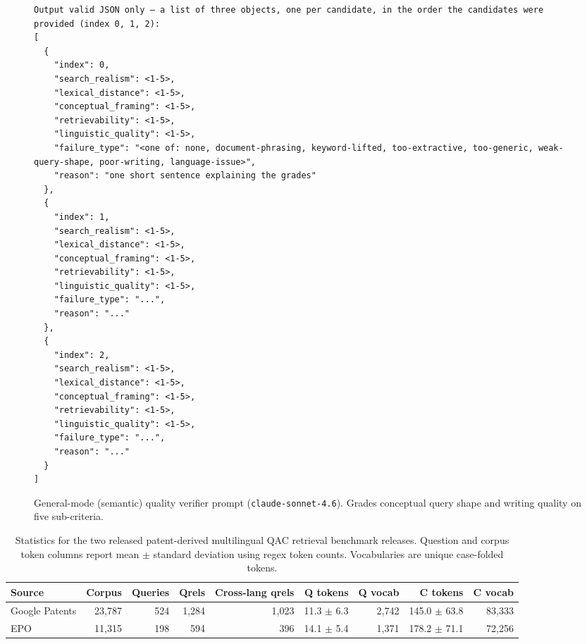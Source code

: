 \begin{figure}[h!]
\begin{minipage}{0.95\textwidth}
\begin{Verbatim}[breaklines=true, breakanywhere=true]
Output valid JSON only — a list of three objects, one per candidate, in the order the candidates were provided (index 0, 1, 2):
[
  {
    "index": 0,
    "search_realism": <1-5>,
    "lexical_distance": <1-5>,
    "conceptual_framing": <1-5>,
    "retrievability": <1-5>,
    "linguistic_quality": <1-5>,
    "failure_type": "<one of: none, document-phrasing, keyword-lifted, too-extractive, too-generic, weak-query-shape, poor-writing, language-issue>",
    "reason": "one short sentence explaining the grades"
  },
  {
    "index": 1,
    "search_realism": <1-5>,
    "lexical_distance": <1-5>,
    "conceptual_framing": <1-5>,
    "retrievability": <1-5>,
    "linguistic_quality": <1-5>,
    "failure_type": "...",
    "reason": "..."
  },
  {
    "index": 2,
    "search_realism": <1-5>,
    "lexical_distance": <1-5>,
    "conceptual_framing": <1-5>,
    "retrievability": <1-5>,
    "linguistic_quality": <1-5>,
    "failure_type": "...",
    "reason": "..."
  }
]
\end{Verbatim}
\end{minipage}
\caption{General-mode (semantic) quality verifier prompt (\texttt{claude-sonnet-4.6}). Grades conceptual query shape and writing quality on five sub-criteria.}
\label{fig:verifier-general}
\end{figure}

\begin{table}[t]
  \centering
  \footnotesize
  \setlength{\tabcolsep}{4.5pt}
  \begin{tabular*}{\textwidth}{@{\extracolsep{\fill}}lrrrrrrrr@{}}
    \toprule
    Source & Corpus & Queries & Qrels & Cross-lang qrels & Q tokens & Q vocab & C tokens & C vocab \\
    \midrule
    Google Patents & 23,787 & 524 & 1,284 & 1,023 & 11.3 $\pm$ 6.3 & 2,742 & 145.0 $\pm$ 63.8 & 83,333 \\
    EPO & 11,315 & 198 & 594 & 396 & 14.1 $\pm$ 5.4 & 1,371 & 178.2 $\pm$ 71.1 & 72,256 \\
    \bottomrule
  \end{tabular*}
  \caption{Statistics for the two released patent-derived multilingual QAC retrieval benchmark releases. Question and corpus token columns report mean $\pm$ standard deviation using regex token counts. Vocabularies are unique case-folded tokens.}
  \label{tab:benchmark-stats}
\end{table}
